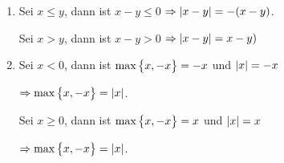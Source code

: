 \documentclass{scrreprt}
\begin{document}
\begin{enumerate}[a)]
\begin{enumerate}[(1)]
  \item
    \begin{minipage}[t]{.4\textwidth}
      Sei $x \leq y$,  dann ist $x - y \leq 0$
      $\Rightarrow \abs{x - y} =  -(x - y)$.

    \end{minipage}
    \hfill
    \vrule
    \hfill
    \begin{minipage}[t]{.4\textwidth}
      Sei $x > y$, dann ist $x - y > 0$
      $\Rightarrow \abs{x - y} = x - y)$

    \end{minipage}

  \item
    \begin{minipage}[t]{.4\textwidth}
      Sei $x < 0$,  dann ist $\max\qty\big{x, -x} = -x$
      und $\abs{x} = -x$

      $\Rightarrow \max\qty\big{x, -x} = \abs{x}$.
    \end{minipage}
    \hfill
    \vrule
    \hfill
    \begin{minipage}[t]{.4\textwidth}
      Sei $x \geq 0$,  dann ist $\max\qty\big{x, -x} = x$
      und $\abs{x} = x$

      $\Rightarrow \max\qty\big{x, -x} = \abs{x}$.
    \end{minipage}
  \end{enumerate}
\end{enumerate}
\end{document}
